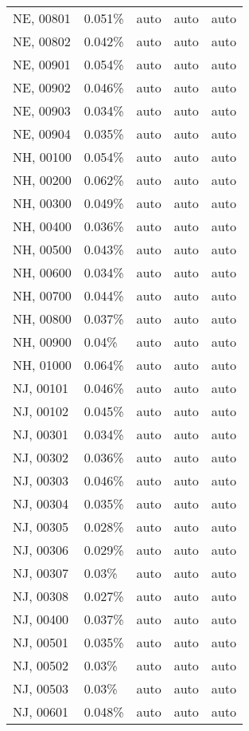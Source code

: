 \begin{longtable}[]{@{}lllll@{}}
NE, 00801 & 0.051\% & auto & auto & auto \\
NE, 00802 & 0.042\% & auto & auto & auto \\
NE, 00901 & 0.054\% & auto & auto & auto \\
NE, 00902 & 0.046\% & auto & auto & auto \\
NE, 00903 & 0.034\% & auto & auto & auto \\
NE, 00904 & 0.035\% & auto & auto & auto \\
NH, 00100 & 0.054\% & auto & auto & auto \\
NH, 00200 & 0.062\% & auto & auto & auto \\
NH, 00300 & 0.049\% & auto & auto & auto \\
NH, 00400 & 0.036\% & auto & auto & auto \\
NH, 00500 & 0.043\% & auto & auto & auto \\
NH, 00600 & 0.034\% & auto & auto & auto \\
NH, 00700 & 0.044\% & auto & auto & auto \\
NH, 00800 & 0.037\% & auto & auto & auto \\
NH, 00900 & 0.04\% & auto & auto & auto \\
NH, 01000 & 0.064\% & auto & auto & auto \\
NJ, 00101 & 0.046\% & auto & auto & auto \\
NJ, 00102 & 0.045\% & auto & auto & auto \\
NJ, 00301 & 0.034\% & auto & auto & auto \\
NJ, 00302 & 0.036\% & auto & auto & auto \\
NJ, 00303 & 0.046\% & auto & auto & auto \\
NJ, 00304 & 0.035\% & auto & auto & auto \\
NJ, 00305 & 0.028\% & auto & auto & auto \\
NJ, 00306 & 0.029\% & auto & auto & auto \\
NJ, 00307 & 0.03\% & auto & auto & auto \\
NJ, 00308 & 0.027\% & auto & auto & auto \\
NJ, 00400 & 0.037\% & auto & auto & auto \\
NJ, 00501 & 0.035\% & auto & auto & auto \\
NJ, 00502 & 0.03\% & auto & auto & auto \\
NJ, 00503 & 0.03\% & auto & auto & auto \\
NJ, 00601 & 0.048\% & auto & auto & auto \\

\end{longtable}
